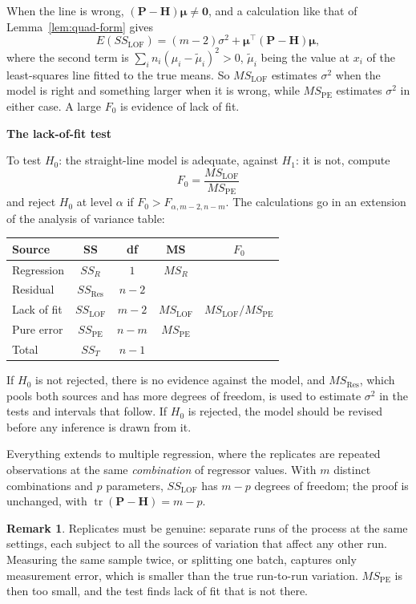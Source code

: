 \documentclass[11pt,a4paper]{article}
\numberwithin{equation}{section}
\theoremstyle{definition}
\newtheorem*{remark}{Remark}
\newcommand{\subhead}[1]{%
  \par\medskip\noindent\textbf{#1}\par\nobreak\smallskip}
\begin{document}
When the line is wrong, $(\mathbf{P} - \mathbf{H})\boldsymbol\mu \neq \mathbf{0}$, and a
calculation like that of Lemma~\ref{lem:quad-form} gives
\[
E(SS_{\mathrm{LOF}}) = (m - 2)\sigma^2 + \boldsymbol\mu^\top(\mathbf{P} - \mathbf{H})\boldsymbol\mu ,
\]
where the second term is $\sum_i n_i(\mu_i - \tilde\mu_i)^2 > 0$, $\tilde\mu_i$ being the
value at $x_i$ of the least-squares line fitted to the true means. So $MS_{\mathrm{LOF}}$
estimates $\sigma^2$ when the model is right and something larger when it is wrong, while
$MS_{\mathrm{PE}}$ estimates $\sigma^2$ in either case. A large $F_0$ is evidence of lack of
fit.

\subhead{The lack-of-fit test}
To test $H_0$: the straight-line model is adequate, against $H_1$: it is not, compute
\[
F_0 = \frac{MS_{\mathrm{LOF}}}{MS_{\mathrm{PE}}}
\]
and reject $H_0$ at level $\alpha$ if $F_0 > F_{\alpha, m - 2, n - m}$. The calculations go in an extension of the analysis of
variance table:
\begin{center}
\begin{tabular}{lcccc}
Source & SS & df & MS & $F_0$ \\
\hline
Regression & $SS_R$ & $1$ & $MS_R$ & \\
Residual & $SS_{\mathrm{Res}}$ & $n - 2$ & & \\
\quad Lack of fit & $SS_{\mathrm{LOF}}$ & $m - 2$ & $MS_{\mathrm{LOF}}$ & $MS_{\mathrm{LOF}}/MS_{\mathrm{PE}}$ \\
\quad Pure error & $SS_{\mathrm{PE}}$ & $n - m$ & $MS_{\mathrm{PE}}$ & \\
\hline
Total & $SS_T$ & $n - 1$ & & \\
\end{tabular}
\end{center}
If $H_0$ is not rejected, there is no evidence against the model, and $MS_{\mathrm{Res}}$,
which pools both sources and has more degrees of freedom, is used to estimate $\sigma^2$
in the tests and intervals that follow. If $H_0$ is rejected, the model should be revised
before any inference is drawn from it.

Everything extends to multiple regression, where the replicates are repeated observations
at the same \emph{combination} of regressor values. With $m$ distinct combinations and $p$
parameters, $SS_{\mathrm{LOF}}$ has $m - p$ degrees of freedom; the proof is unchanged, with
$\operatorname{tr}(\mathbf{P} - \mathbf{H}) = m - p$.

\begin{remark}
Replicates must be genuine: separate runs of the process at the same settings, each
subject to all the sources of variation that affect any other run. Measuring the same
sample twice, or splitting one batch, captures only measurement error, which is smaller
than the true run-to-run variation. $MS_{\mathrm{PE}}$ is then too small, and the test finds
lack of fit that is not there.
\end{remark}
\end{document}
